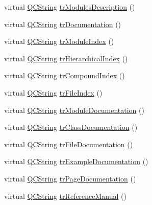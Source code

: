 \begin{DoxyCompactItemize}
\item 
virtual \mbox{\hyperlink{class_q_c_string}{Q\+C\+String}} \mbox{\hyperlink{class_translator_serbian_cyrillic_af2862f58c96b5e6d349af7bf1d316c27}{tr\+Modules\+Description}} ()
\item 
virtual \mbox{\hyperlink{class_q_c_string}{Q\+C\+String}} \mbox{\hyperlink{class_translator_serbian_cyrillic_a73d5b165d77c02369bc70a69f01c937a}{tr\+Documentation}} ()
\item 
virtual \mbox{\hyperlink{class_q_c_string}{Q\+C\+String}} \mbox{\hyperlink{class_translator_serbian_cyrillic_aa0b9a6c8751a995d2ebf206758ca79dd}{tr\+Module\+Index}} ()
\item 
virtual \mbox{\hyperlink{class_q_c_string}{Q\+C\+String}} \mbox{\hyperlink{class_translator_serbian_cyrillic_a8b35d7c5687fa3656ecc5e56ce751d26}{tr\+Hierarchical\+Index}} ()
\item 
virtual \mbox{\hyperlink{class_q_c_string}{Q\+C\+String}} \mbox{\hyperlink{class_translator_serbian_cyrillic_af375b8ce5dc36f46b98bcc9d2cf3ea42}{tr\+Compound\+Index}} ()
\item 
virtual \mbox{\hyperlink{class_q_c_string}{Q\+C\+String}} \mbox{\hyperlink{class_translator_serbian_cyrillic_a243e680a570f9a12cae51cf8245e5488}{tr\+File\+Index}} ()
\item 
virtual \mbox{\hyperlink{class_q_c_string}{Q\+C\+String}} \mbox{\hyperlink{class_translator_serbian_cyrillic_a32950c13050db230bdb85fc7b42a509d}{tr\+Module\+Documentation}} ()
\item 
virtual \mbox{\hyperlink{class_q_c_string}{Q\+C\+String}} \mbox{\hyperlink{class_translator_serbian_cyrillic_a3e92779ffa151bacd460e616d8670925}{tr\+Class\+Documentation}} ()
\item 
virtual \mbox{\hyperlink{class_q_c_string}{Q\+C\+String}} \mbox{\hyperlink{class_translator_serbian_cyrillic_a8d2d65276cbb4cc04c5d72fe74da4266}{tr\+File\+Documentation}} ()
\item 
virtual \mbox{\hyperlink{class_q_c_string}{Q\+C\+String}} \mbox{\hyperlink{class_translator_serbian_cyrillic_a15f1c1e7cb0e576db381c487618e3eb2}{tr\+Example\+Documentation}} ()
\item 
virtual \mbox{\hyperlink{class_q_c_string}{Q\+C\+String}} \mbox{\hyperlink{class_translator_serbian_cyrillic_a89d1781c52cef58491c9fedd064fb197}{tr\+Page\+Documentation}} ()
\item 
virtual \mbox{\hyperlink{class_q_c_string}{Q\+C\+String}} \mbox{\hyperlink{class_translator_serbian_cyrillic_a0a5a8d376effc003a2bf6e943773af29}{tr\+Reference\+Manual}} ()

\end{DoxyCompactItemize}
